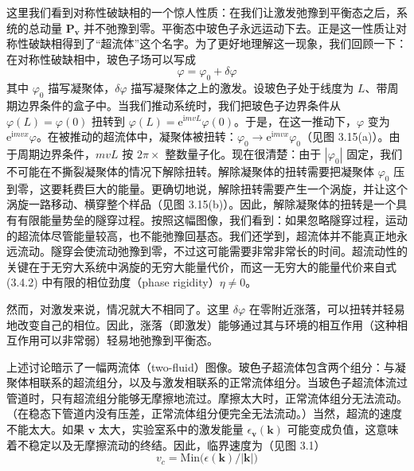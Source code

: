 这里我们看到对称性破缺相的一个惊人性质：在我们让激发弛豫到平衡态之后，系统的总动量 $\pmb{P}_{\pmb{v}}$ 并不弛豫到零。平衡态中玻色子永远运动下去。正是这一性质让对称性破缺相得到了“超流体”这个名字。为了更好地理解这一现象，我们回顾一下：在对称性破缺相中，玻色子场可以写成
\begin{equation*}
\varphi=\varphi_0+\delta\varphi
\end{equation*}
其中 $\varphi_0$ 描写凝聚体，$\delta\varphi$ 描写凝聚体之上的激发。设玻色子处于线度为 $L$、带周期边界条件的盒子中。当我们推动系统时，我们把玻色子边界条件从 $\varphi(L)=\varphi(0)$ 扭转到 $\varphi(L)=\mathrm{e}^{\mathrm{i}mvL}\varphi(0)$。于是，在这一推动下，$\varphi$ 变为 $\mathrm{e}^{\mathrm{i}mvx}\varphi$。在被推动的超流体中，凝聚体被扭转：$\varphi_0\to\mathrm{e}^{\mathrm{i}mvx}\varphi_0$（见图 3.15(a)）。由于周期边界条件，$mvL$ 按 $2\pi\times$ 整数量子化。现在很清楚：由于 $|\varphi_0|$ 固定，我们不可能在不撕裂凝聚体的情况下解除扭转。解除凝聚体的扭转需要把凝聚体 $\varphi_0$ 压到零，这要耗费巨大的能量。更确切地说，解除扭转需要产生一个涡旋，并让这个涡旋一路移动、横穿整个样品（见图 3.15(b)）。因此，解除凝聚体的扭转是一个具有有限能量势垒的隧穿过程。按照这幅图像，我们看到：如果忽略隧穿过程，运动的超流体尽管能量较高，也不能弛豫回基态。我们还学到，超流体并不能真正地永远流动。隧穿会使流动弛豫到零，不过这可能需要非常非常长的时间。超流动性的关键在于无穷大系统中涡旋的无穷大能量代价，而这一无穷大的能量代价来自式 (3.4.2) 中有限的相位劲度（phase rigidity）$\eta\neq0$。

然而，对激发来说，情况就大不相同了。这里 $\delta\varphi$ 在零附近涨落，可以扭转并轻易地改变自己的相位。因此，涨落（即激发）能够通过其与环境的相互作用（这种相互作用可以非常弱）轻易地弛豫到平衡态。

上述讨论暗示了一幅两流体（two-fluid）图像。玻色子超流体包含两个组分：与凝聚体相联系的超流组分，以及与激发相联系的正常流体组分。当玻色子超流体流过管道时，只有超流组分能够无摩擦地流过。摩擦太大时，正常流体组分无法流动。（在稳态下管道内没有压差，正常流体组分便完全无法流动。）当然，超流的速度不能太大。如果 $\pmb{v}$ 太大，实验室系中的激发能量 $\epsilon_{\pmb{v}}(\pmb{k})$ 可能变成负值，这意味着不稳定以及无摩擦流动的终结。因此，临界速度为（见图 3.1）
\begin{equation*}
v_c=\mathrm{Min}\big(\epsilon(\pmb{k})/|\pmb{k}|\big)
\end{equation*}


